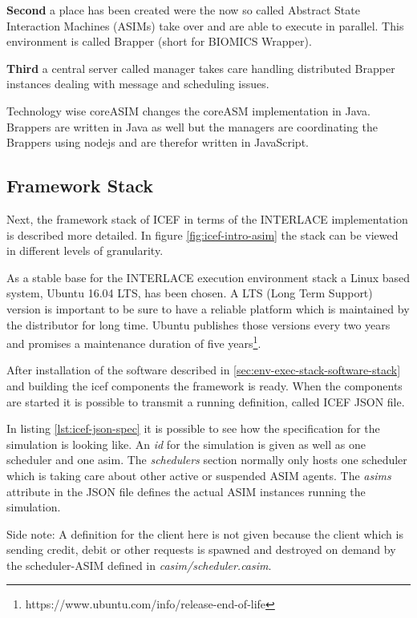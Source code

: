\textbf{Second} a place has been created were the now so called Abstract State Interaction Machines (ASIMs) take over and are able to execute in parallel. This environment is called Brapper (short for BIOMICS Wrapper).

\textbf{Third} a central server called manager takes care handling distributed Brapper instances dealing with message and scheduling issues.

Technology wise coreASIM changes the coreASM implementation in Java. Brappers are written in Java as well but the managers are coordinating the Brappers using nodejs and are therefor written in JavaScript.

\subsection{Framework Stack}

Next, the framework stack of ICEF in terms of the INTERLACE implementation is described more detailed. In figure \ref{fig:icef-intro-asim} the stack can be viewed in different levels of granularity.

As a stable base for the INTERLACE execution environment stack a Linux based system, Ubuntu 16.04 LTS, has been chosen. A LTS (Long Term Support) version is important to be sure to have a reliable platform which is maintained by the distributor for long time. Ubuntu publishes those versions every two years and promises a maintenance duration of five years\footnote{https://www.ubuntu.com/info/release-end-of-life}.

After installation of the software described in \ref{sec:env-exec-stack-software-stack} and building the icef components the framework is ready. When the components are started it is possible to transmit a running definition, called ICEF JSON file.

In listing \ref{lst:icef-json-spec} it is possible to see how the specification for the simulation is looking like. An \textit{id} for the simulation is given as well as one scheduler and one asim. The \textit{schedulers} section normally only hosts one scheduler which is taking care about other active or suspended ASIM agents. The \textit{asims} attribute in the JSON file defines the actual ASIM instances running the simulation.

Side note: A definition for the client here is not given because the client which is sending credit, debit or other requests is spawned and destroyed on demand by the scheduler-ASIM defined in \textit{casim/scheduler.casim}.


